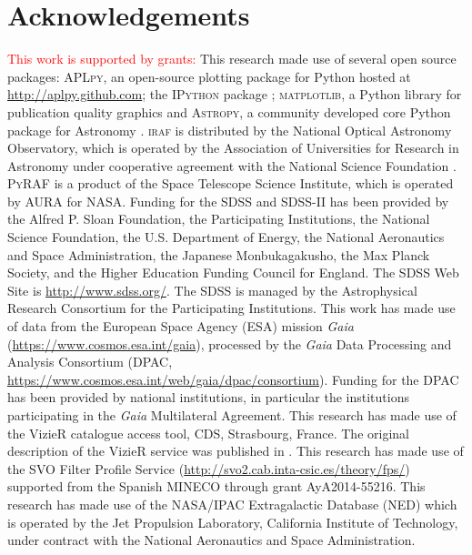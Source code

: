 \documentclass[apj, revtex4-1]{emulateapj}
\newcommand{\editorial}[1]{\textcolor{red}{#1}}
\begin{document}
\section*{Acknowledgements}
\editorial{This work is supported by grants:}
This research made use of several open source packages: \textsc{APLpy}, an open-source plotting package for Python hosted at \url{http://aplpy.github.com}; the \textsc{IPython} package \citep{Perez2007}; \textsc{matplotlib}, a Python library for publication quality graphics \citep{Hunter2007} and \textsc{Astropy}, a community developed core Python package for Astronomy \citep{TheAstropyCollaboration2013}.
\textsc{iraf} is distributed by the National Optical Astronomy Observatory, which is operated by the Association of Universities for Research in Astronomy under cooperative agreement with the National Science Foundation \citep{Tody1993}.
\textsc{PyRAF} is a product of the Space Telescope Science Institute, which is operated by AURA for NASA.
Funding for the SDSS and SDSS-II has been provided by the Alfred P. Sloan Foundation, the Participating Institutions, the National Science Foundation, the U.S. Department of Energy, the National Aeronautics and Space Administration, the Japanese Monbukagakusho, the Max Planck Society, and the Higher Education Funding Council for England. The SDSS Web Site is \url{http://www.sdss.org/}. The SDSS is managed by the Astrophysical Research Consortium for the Participating Institutions.
This work has made use of data from the European Space Agency (ESA) mission \textit{Gaia} (\url{https://www.cosmos.esa.int/gaia}), processed by the \textit{Gaia} Data Processing and Analysis Consortium (DPAC, \url{https://www.cosmos.esa.int/web/gaia/dpac/consortium}). Funding for the DPAC has been provided by national institutions, in particular the institutions participating in the \textit{Gaia} Multilateral Agreement.
This research has made use of the VizieR catalogue access tool, CDS, Strasbourg, France. The original description of the VizieR service was published in \cite{Ochsenbein2000}.
This research has made use of the SVO Filter Profile Service (\url{http://svo2.cab.inta-csic.es/theory/fps/}) supported from the Spanish MINECO through grant AyA2014-55216.
This research has made use of the NASA/IPAC Extragalactic Database (NED) which is operated by the Jet Propulsion Laboratory, California Institute of Technology, under contract with the National Aeronautics and Space Administration.




\end{document}
